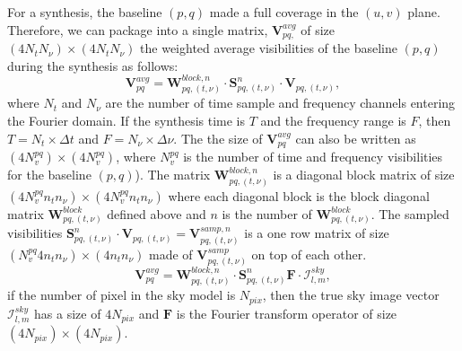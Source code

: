\documentclass[useAMS,usenatbib]{mn2e}
\begin{document}
For a synthesis, the baseline $(p,q)$ made a full coverage in the $(u,v)$ plane. Therefore, we can  
package into a single matrix, $\mathbf{V}_{pq,}^{avg}$ of size $(4N_t N_{\nu})\times (4N_t N_{\nu})$ the 
weighted average visibilities of the  baseline $(p,q)$ during the synthesis as follows: 
\begin{equation}
\mathbf{V}_{pq}^{avg}= \mathbf{W}_{pq,(t,\nu)}^{block,n}\cdot\mathbf{S}_{pq,(t,\nu)}^{n}\cdot\mathbf{V}_{pq,(t,\nu)},\label{eq2:block}
\end{equation}
where $N_t$ and  $N_{\nu}$ are the number of time sample and frequency channels entering the Fourier domain. If the synthesis time is $T$ 
and the frequency range is $F$, then $T=N_t \times \Delta t$ and $F=N_{\nu}\times\Delta \nu$. The the size of 
$\mathbf{V}_{pq}^{avg}$ can also be written as $(4N_v^{pq})\times (4N_v^{pq})$, where $N_v^{pq}$ is the 
number of time and frequency visibilities for the baseline $(p,q)$). The matrix $\mathbf{W}_{pq,(t,\nu)}^{block,n}$ is a diagonal block 
matrix of size $(4N_v^{pq}n_t n_{\nu})\times (4N_v^{pq}n_t n_{\nu})$ where each diagonal block is the block diagonal matrix 
$\mathbf{W}_{pq,(t,\nu)}^{block}$ defined above and $n$ is the number of $\mathbf{W}_{pq,(t,\nu)}^{block}$. The sampled visibilities
$\mathcal{\textbf{S}}_{pq,(t,\nu)}^{n}\cdot\mathbf{V}_{pq,(t,\nu)}=\textbf{V}_{pq,(t,\nu)}^{samp,n}$ is a one row matrix of size 
$(N_v^{pq}4 n_t n_{\nu})\times (4 n_t n_{\nu})$ made of $\textbf{V}_{pq,(t,\nu)}^{samp}$ on top of each other. 
\begin{equation}
\mathbf{V}_{pq}^{avg}= \mathbf{W}_{pq,(t,\nu)}^{block,n}\cdot 
\mathbf{S}_{pq,(t,\nu)}^{n}\mathbf{F}\cdot\mathcal{I}_{l,m}^{sky},\label{eqv:linear}
\end{equation}
if the number of pixel in the sky model is $N_{pix}$, then the true sky image vector $\mathcal{I}_{l,m}^{sky}$ has a size of $4N_{pix}$ and 
$\textbf{F}$ is the Fourier transform operator of size $(4N_{pix})\times(4N_{pix})$. 
\end{document}
